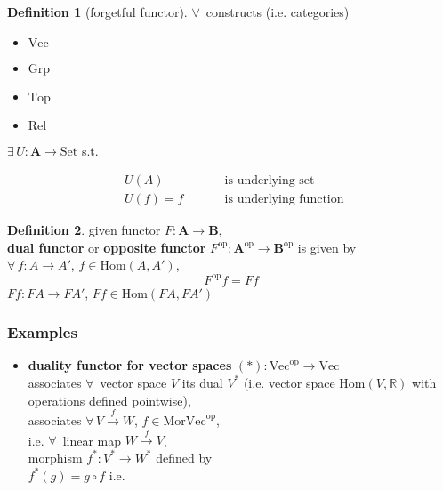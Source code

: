 \documentclass[twoside,landscape,10pt]{amsart}
\theoremstyle{plain}
\theoremstyle{definition}
\newtheorem{definition}{Definition}
\theoremstyle{remark}
\begin{document}
\begin{multicols*}{2}
\begin{definition}[forgetful functor]
$\forall \, $ constructs (i.e. categories)
\begin{itemize}
  \item $\text{Vec}$
  \item $\text{Grp}$
  \item $\text{Top}$
  \item $\text{Rel}$
\end{itemize}

$\exists \, U : \mathbf{A} \to \text{Set}$ s.t. 

\[
\begin{aligned}
  & U(A) \qquad \, & \text{ is underlying set } \\ 
    & U(f) =f \qquad \, & \text{ is underlying function } 
\end{aligned}
\]


\end{definition}


\begin{definition}
  given functor $F: \mathbf{A} \to \mathbf{B}$, \\
\textbf{dual functor} or \textbf{opposite functor} $F^{\text{op}} : \mathbf{A}^{\text{op}} \to \mathbf{B}^{\text{op}}$ is given by  \\
$\forall \, f : A \to A'$, $f\in \text{Hom}(A,A')$, 
\[
F^{\text{op}}f = Ff 
\]
$Ff : FA \to FA'$, $Ff \in \text{Hom}(FA,FA')$
\end{definition}



\subsubsection{Examples}

\begin{itemize}
  \item \textbf{duality functor for vector spaces } $(*) : \text{Vec}^{\text{op}} \to \text{Vec}$ \\
associates $\forall \, $ vector space $V$ its dual $V^*$ (i.e. vector space $\text{Hom}(V,\mathbb{R})$ with operations defined pointwise), \\
associates $\forall \, V\xrightarrow{f}W$, $f\in \text{Mor}\text{Vec}^{\text{op}}$, \\
i.e. $\forall \, $ linear map $W \xrightarrow{f} V$, \\
morphism $f^*:V^* \to W^*$ defined by \\
\phantom{morphism} $f^*(g) = g\circ f$ i.e. 




\end{itemize}
\end{multicols*}
\end{document}
